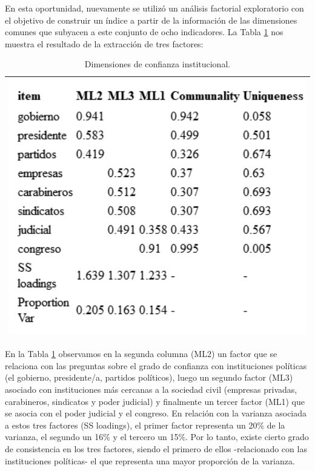 \documentclass[
  12pt,
]{book}
\begin{document}
En esta oportunidad, nuevamente se utilizó un análisis factorial exploratorio con el objetivo de construir un índice a partir de la información de las dimensiones comunes que subyacen a este conjunto de ocho indicadores. La Tabla \ref{tab:inst-fa} nos muestra el resultado de la extracción de tres factores:

\begin{longtable}[]{@{}l@{}}
\caption{\label{tab:inst-fa}Dimensiones de confianza institucional.}\tabularnewline
\toprule
\endhead
\includegraphics[width=5.20833in,height=\textheight]{output/tables/inst_fa.png} \\
\bottomrule
\end{longtable}

En la Tabla \ref{tab:inst-fa} observamos en la segunda columna (ML2) un factor que se relaciona con las preguntas sobre el grado de confianza con instituciones políticas (el gobierno, presidente/a, partidos políticos), luego un segundo factor (ML3) asociado con instituciones más cercanas a la sociedad civil (empresas privadas, carabineros, sindicatos y poder judicial) y finalmente un tercer factor (ML1) que se asocia con el poder judicial y el congreso. En relación con la varianza asociada a estos tres factores (SS loadings), el primer factor representa un 20\% de la varianza, el segundo un 16\% y el tercero un 15\%. Por lo tanto, existe cierto grado de consistencia en los tres factores, siendo el primero de ellos -relacionado con las instituciones políticas- el que representa una mayor proporción de la varianza.
\end{document}
